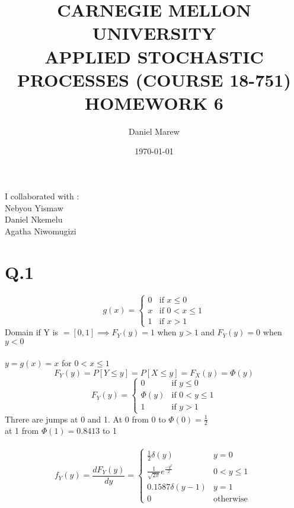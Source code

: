 \documentclass[a4paper,11pt]{article}
\begin{document}
\title{\color{red}CARNEGIE MELLON UNIVERSITY\\
APPLIED STOCHASTIC PROCESSES  (COURSE 18-751)\\
HOMEWORK 6}
\author{Daniel Marew}
\date{\today}
\clearpage\maketitle

\thispagestyle{empty}
\newpage
I collaborated with :\\
\hspace*{6cm}
Nebyou Yismaw\\
\hspace*{6cm}
Daniel    Nkemelu\\
\hspace*{6cm}
Agatha Niwomugizi
\thispagestyle{empty}
\newpage
\clearpage
\setcounter{page}{1}
\section*{Q.1}

\[
 g(x) = 
  \begin{cases} 
   0 & \text{if } x \leq 0 \\
   x       & \text{if } 0< x \leq 1\\
   1       & \text{if } x > 1
  \end{cases}
\]
Domain if Y is $=[0,1] \implies F_Y(y)=1$ when $y>1$ and $F_Y(y)=0$ when $y<0$\\\\
$y=g(x)=x$ for $0< x \leq 1$
$$F_Y(y)=P[Y\leq y]=P[X\leq y]=F_X(y)=\Phi(y)$$
\[
 F_Y(y) = 
  \begin{cases} 
   0 & \text{if } y \leq 0 \\
   \Phi(y)       & \text{if } 0< y \leq 1\\
   1       & \text{if } y > 1
  \end{cases}
\]
Threre are jumps at 0 and 1. At 0 from 0 to $\Phi(0)=\frac{1}{2}$\\ at 1 from $\Phi(1)=0.8413$ to 1\\\\
\[
 f_Y(y) = \frac{dF_Y(y)}{dy}=
  \begin{cases} 
   \frac{1}{2}\delta(y) &  y = 0 \\
   \frac{1}{\sqrt{2\pi}}e^{\frac{-y^2}{2}}      &  0< y \leq 1\\
   0.1587\delta(y-1)       &  y = 1\\
   0       & \text{otherwise }
  \end{cases}
\]
\end{document}
